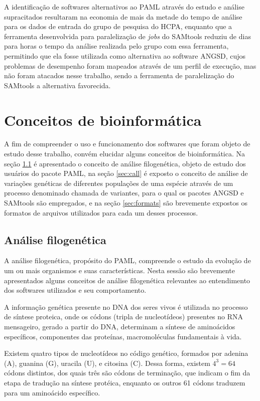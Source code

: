 \documentclass[cic,tc]{iiufrgs}
\begin{document}
A identificação de softwares alternativos ao PAML através do estudo e análise
supracitados resultaram na economia de mais da metade do tempo de análise para
os dados de entrada do grupo de pesquisa do HCPA, enquanto que a ferramenta
desenvolvida para paralelização de \textit{jobs} do SAMtools reduziu de dias
para horas o tempo da análise realizada pelo grupo com essa ferramenta,
permitindo que ela fosse utilizada como alternativa ao software ANGSD, cujos
problemas de desempenho foram mapeados através de um perfil de execução, mas
não foram atacados nesse trabalho, sendo a ferramenta de paralelização do
SAMtools a alternativa favorecida.

\section{Conceitos de bioinformática}

A fim de compreender o uso e funcionamento dos softwares que foram objeto de
estudo desse trabalho, convém elucidar alguns conceitos de bioinformática. Na
seção \ref{sec:filo} é apresentado o conceito de análise filogenética, objeto
de estudo dos usuários do pacote PAML, na seção \ref{sec:call} é exposto o
conceito de análise de variações genéticas de diferentes populações de uma
espécie através de um processo denominado chamada de variantes, para o qual os
pacotes ANGSD e SAMtools são empregados, e na seção \ref{sec:formats} são
brevemente expostos os formatos de arquivos utilizados para cada um desses
processos.

\subsection{Análise filogenética}
\label{sec:filo}

A análise filogenética, propósito do PAML, compreende o estudo da evolução de
um ou mais organismos e suas características. Nesta sessão são brevemente
apresentados alguns conceitos de análise filogenética relevantes ao
entendimento dos softwares utilizados e seu comportamento.

A informação genética presente no DNA dos seres vivos é utilizada no processo
de síntese proteica, onde os códons (tripla de nucleotídeos) presentes no RNA
mensageiro, gerado a partir do DNA, determinam a síntese de aminoácidos
específicos, componentes das proteínas, macromoléculas fundamentais à vida.

Existem quatro tipos de nucleotídeos no código genético, formados por adenina
(A), guanina (G), uracila (U), e citosina (C). Dessa forma, existem $4^3 = 64$
códons distintos, dos quais três são códons de terminação, que indicam o fim da
etapa de tradução na síntese protéica, enquanto os outros 61 códons traduzem
para um aminoácido específico.
\end{document}
